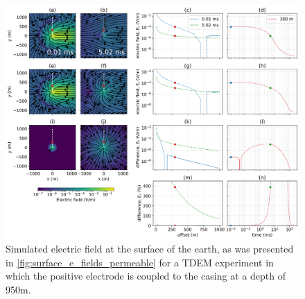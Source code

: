 \begin{figure}
    \begin{center}
    \includegraphics[width=\textwidth]{figures/em_casing/surface_e_fields_permeable_downhole.png}
    \end{center}
\caption{
    Simulated electric field at the surface of the earth, as was presented in \ref{fig:surface_e_fields_permeable}
    for a TDEM experiment in which the positive electrode is coupled to the casing at a depth of 950m.
}
\label{fig:surface_e_fields_permeable_downhole}
\end{figure}



